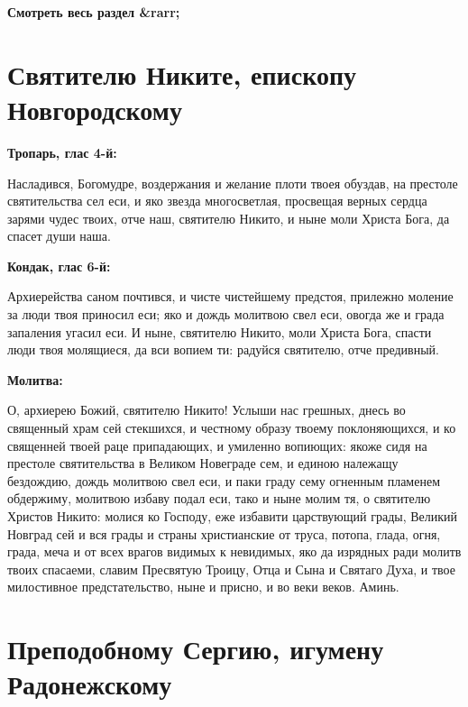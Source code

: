 \mychapterending


\bfseries Смотреть весь раздел &rarr;\normalfont{} 

\section{Святителю Никите, епископу Новгородскому}
 


\bfseries Тропарь, глас 4-й:\normalfont{}


Насладився, Богомудре, воздержания и желание плоти твоея обуздав, на престоле святительства сел еси, и яко звезда многосветлая, просвещая верных сердца зарями чудес твоих, отче наш, святителю Никито, и ныне моли Христа Бога, да спасет души наша.


\medskip


\bfseries Кондак, глас 6-й:\normalfont{}


Архиерейства саном почтився, и чисте чистейшему предстоя, прилежно моление за люди твоя приносил еси; яко и дождь молитвою свел еси, овогда же и града запаления угасил еси. И ныне, святителю Никито, моли Христа Бога, спасти люди твоя молящиеся, да вси вопием ти: радуйся святителю, отче предивный.


\medskip


\bfseries Молитва:\normalfont{}


О, архиерею Божий, святителю Никито! Услыши нас грешных, днесь во священный храм сей стекшихся, и честному образу твоему поклоняющихся, и ко священней твоей раце припадающих, и умиленно вопиющих: якоже сидя на престоле святительства в Великом Новеграде сем, и единою належащу бездождию, дождь молитвою свел еси, и паки граду сему огненным пламенем обдержиму, молитвою избаву подал еси, тако и ныне молим тя, о святителю Христов Никито: молися ко Господу, еже избавити царствующий грады, Великий Новград сей и вся грады и страны христианские от труса, потопа, глада, огня, града, меча и от всех врагов видимых к невидимых, яко да изрядных ради молитв твоих спасаеми, славим Пресвятую Троицу, Отца и Сына и Святаго Духа, и твое милостивное предстательство, ныне и присно, и во веки веков. Аминь.


\section{Преподобному Сергию, игумену Радонежскому}
 
